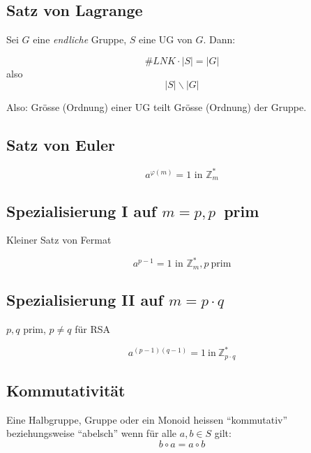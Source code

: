 \documentclass[a4paper, ngerman, landscape, fleqn]{article}
\begin{document}
\begin{multicols*}{3}
\subsection*{Satz von Lagrange}
Sei $G$ eine \emph{endliche} Gruppe, $S$ eine UG von $G$. Dann:

\begin{equation*}
    \#LNK \cdot |S| = |G|
\end{equation*}
also
\begin{equation*}
    |S| \backslash |G|
\end{equation*}

Also: Grösse (Ordnung) einer UG teilt Grösse (Ordnung) der Gruppe.

\subsection*{Satz von Euler}
\begin{equation*}
    a^{\varphi(m)} = 1 \text{ in } \mathbb{Z}^*_m
\end{equation*}

\subsection*{Spezialisierung I auf $m=p, p$\ prim}
Kleiner Satz von Fermat

\begin{equation*}
    a^{p-1} = 1 \text{ in } \mathbb{Z}^*_m, p\ \text{prim}
\end{equation*}

\subsection*{Spezialisierung II auf $m=p \cdot q$}
$p, q$ prim, $p\neq q$ für RSA

\begin{equation*}
    a^{(p - 1)(q - 1)} = 1 \ \mathrm{in} \ \mathbb{Z}^*_{p \cdot q}
\end{equation*}

\subsection*{Kommutativität}
Eine Halbgruppe, Gruppe oder ein Monoid heissen ``kommutativ'' beziehungsweise ``abelsch'' wenn für alle $a, b \in S$ gilt:
\begin{equation*}
    b \circ a = a \circ b
\end{equation*}


\end{multicols*}
\end{document}
